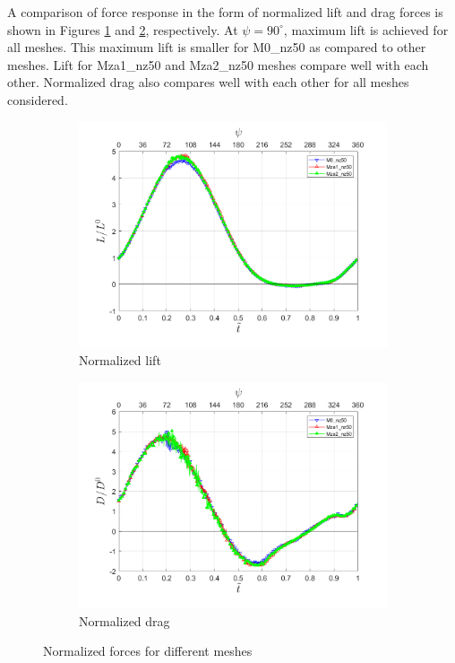 
A comparison of force response in the form of normalized lift and drag forces is shown in Figures \ref{fig:lift_zonal_adapt_Re200k} and \ref{fig:drag_zonal_adapt_Re200k}, respectively. 
At $\psi=90^\circ$, maximum lift is achieved for all meshes.
This maximum lift is smaller for M0\_nz50 as compared to other meshes. 
Lift for Mza1\_nz50 and Mza2\_nz50 meshes compare well with each other.
Normalized drag also compares well with each other for all meshes considered.



\begin{figure}[H]
	\centering
	
	\begin{subfigure}[b]{0.7\textwidth}
		\centering
		\includegraphics[width=1\textwidth]{figures/zonal_adapt_results/force_response_Re200k/Lift_inst.png}
		\caption{Normalized lift}
		\label{fig:lift_zonal_adapt_Re200k}
	\end{subfigure}
	\begin{subfigure}[b]{0.7\textwidth}
		\centering
		\includegraphics[width=1\textwidth]{figures/zonal_adapt_results/force_response_Re200k/Drag_inst.png}
		\caption{Normalized drag}
		\label{fig:drag_zonal_adapt_Re200k}
	\end{subfigure}
	
	\label{fig:force_response_zonal_adapt_Re200k}
	\caption{Normalized forces for different meshes}
\end{figure}
